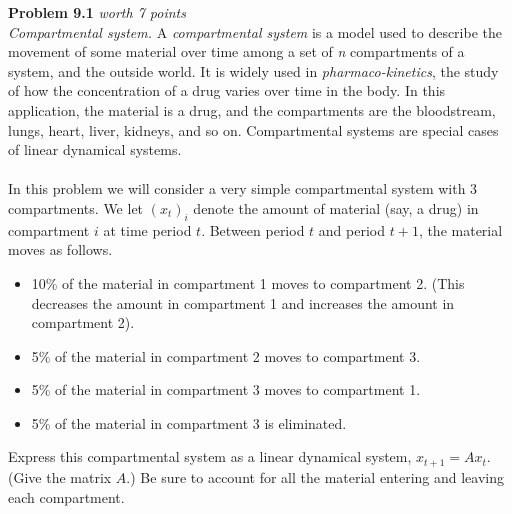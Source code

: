 \documentclass{article}
\newenvironment{problem}[3][Problem]
    { \begin{mdframed}[backgroundcolor=gray!20] \textbf{#1 #2} \textit{worth #3 points} \\}
    {  \end{mdframed}}
\begin{document}
\begin{problem}{9.1}{7}
\textit{Compartmental system.} A \textit{compartmental system} is a model used to describe the movement of some material over time among a set of \textit{n} compartments of a system, and the outside world. It is widely used in \textit{pharmaco-kinetics}, the study of how the concentration of a drug varies over time in the body. In this application, the material is a drug, and the compartments are the bloodstream, lungs, heart, liver, kidneys, and so on. Compartmental systems are special cases of linear dynamical systems.\\
\\
In this problem we will consider a very simple compartmental system with 3 compartments. We let $(x_t)_i$ denote the amount of material (say, a drug) in compartment $i$ at time period $t$. Between period $t$ and period $t+1$, the material moves as follows.
\begin{itemize}
    \item 10\% of the material in compartment 1 moves to compartment 2. (This decreases the amount in compartment 1 and increases the amount in compartment 2).
    \item 5\% of the material in compartment 2 moves to compartment 3.
    \item 5\% of the material in compartment 3 moves to compartment 1.
    \item 5\% of the material in compartment 3 is eliminated.
\end{itemize}
Express this compartmental system as a linear dynamical system, $x_{t+1} = Ax_t$. (Give the matrix $A$.) Be sure to account for all the material entering and leaving each compartment. 
\end{problem}
\end{document}

